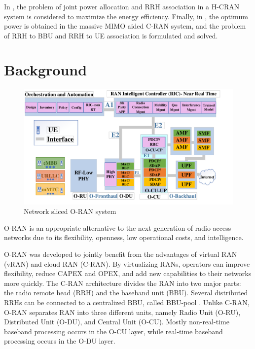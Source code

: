 \documentclass[lettersize,journal]{IEEEtran}
\begin{document}
In \cite{ali2019energy,ali2018joint}, the problem of joint power allocation and RRH association in a H-CRAN system is considered to maximize the energy efficiency.
Finally, in \cite{amani2019power}, the optimum power is obtained in the massive MIMO aided C-RAN system, and the problem of RRH to BBU and RRH to UE association is formulated and solved. 
\section{Background}\label{BG}
\vspace{-1mm}
\begin{figure}
  \centering
  \captionsetup{justification=centering}
    \includegraphics[scale = 0.36]{fig/finalDraw1.pdf}
    \vspace{-6mm}
  \caption{Network sliced O-RAN system}
  \label{fig:c11}
  \vspace{-2mm}
\end{figure}
O-RAN is an appropriate alternative to the next generation of radio access networks due to its flexibility, openness, low operational costs, and intelligence. 

O-RAN was developed to jointly benefit from the advantages of virtual RAN (vRAN) and cloud RAN (C-RAN). By virtualizing RANs, operators can improve flexibility, reduce CAPEX and OPEX, and add new capabilities to their networks more quickly. The C-RAN architecture divides the RAN into two major parts: the radio remote head (RRH) and the baseband unit (BBU). Several distributed RRHs can be connected to a centralized BBU, called BBU-pool \cite{han2019research}. Unlike C-RAN, O-RAN separates RAN into three different units, namely Radio Unit (O-RU), Distributed Unit (O-DU), and Central Unit (O-CU).
Mostly non-real-time baseband processing occurs in the O-CU layer, while real-time baseband processing occurs in the O-DU layer.
\end{document}
